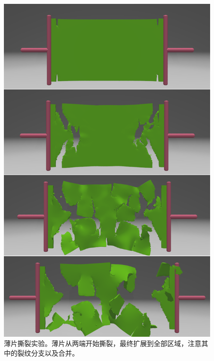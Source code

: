 \newpage
\begin{figure}[!htb]
  \centering
  \captionsetup{justification=centering}
  \includegraphics[width=0.6\linewidth]{chap/image/demo_tear_thin_sheet}

  \caption{\label{demo_tear_thin_sheet}
           薄片撕裂实验。薄片从两端开始撕裂，最终扩展到全部区域，注意其中的裂纹分支以及合并。
          }
\end{figure}

